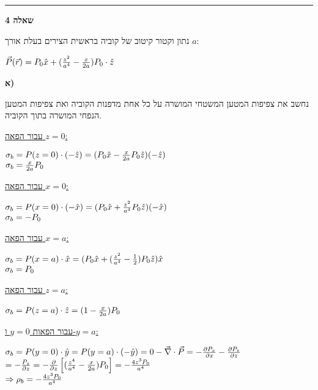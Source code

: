 \documentclass[14pt]{extarticle}
\makeatletter
\newenvironment{lefteqs}{%
    \begin{english}%
    \begin{flushleft}%
    \renewcommand{\arraystretch}{1.3}%
    $\begin{array}{@{}l@{}}%
}{%
    \end{array}$%
    \end{flushleft}%
    \end{english}%
}
\makeatother
\begin{document}
\vspace{3em}
\hrule
\vspace{2em}

\textbf{\large שאלה 4}

נתון וקטור קיטוב של קוביה בראשית הצירים בעלת אורך $a$:

\begin{lefteqs}
    \vec{P}(\vec{r}) = P_0 \hat{x} + (\frac{z^2}{a^4} - \frac{x}{2a})P_0 \cdot \hat{z}
\end{lefteqs}

\textbf{א)}

נחשב את צפיפות המטען המשטחי המושרה על כל אחת מדפנות הקוביה ואת צפיפות המטען הנפחי המושרה בתוך הקוביה.

\underline{עבור הפאה $z=0$:}
\begin{lefteqs}
    \sigma_b = P(z=0) \cdot (-\hat{z}) = (P_0 \hat{x} - \frac{x}{2a}P_0\hat{z})(-\hat{z}) \\
    \sigma_b = \frac{x}{2a}P_0
\end{lefteqs}

\underline{עבור הפאה $x=0$:}
\begin{lefteqs}
    \sigma_b = P(x=0) \cdot (-\hat{x}) = (P_0 \hat{x} + \frac{z^2}{a^4}P_0\hat{z})(-\hat{x}) \\
    \sigma_b = -P_0
\end{lefteqs}

\underline{עבור הפאה $x=a$:}
\begin{lefteqs}
    \sigma_b = P(x=a) \cdot \hat{x} = (P_0 \hat{x} + (\frac{z^2}{a^4} - \frac{1}{2})P_0\hat{z})\hat{x} \\
    \sigma_b = P_0
\end{lefteqs}

\underline{עבור הפאה $z=a$:}
\begin{lefteqs}
    \sigma_b = P(z=a) \cdot \hat{z} = (1 - \frac{x}{2a})P_0 \\
\end{lefteqs}

\underline{עבור הפאות $y=0$ ו-$y=a$:}
\begin{lefteqs}
    \sigma_b = P(y=0) \cdot \hat{y} = P(y=a) \cdot (-\hat{y}) = 0
    -\vec{\nabla} \cdot \vec{P} = -\frac{\partial P_x}{\partial x} - \frac{\partial P_z}{\partial z} \\
    = -\frac{P_z}{\partial z} = -\frac{\partial}{\partial z} \left[ (\frac{z^4}{a^4} - \frac{x}{2a})P_0 \right] = -\frac{4z^3P_0}{a^4} \\
    \Rightarrow \rho_b = -\frac{4z^3P_0}{a^4} \\
\end{lefteqs}
\end{document}
